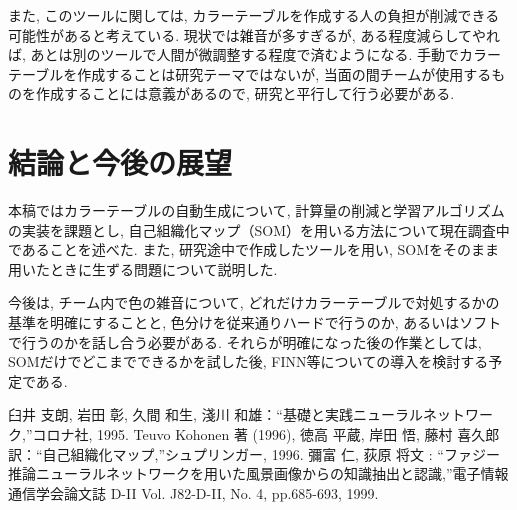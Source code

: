 \documentclass[a4paper,11pt]{jarticle}
\begin{document}
また, このツールに関しては,
カラーテーブルを作成する人の負担が削減できる可能性があると考えている. 
現状では雑音が多すぎるが, ある程度減らしてやれば,
あとは別のツールで人間が微調整する程度で済むようになる. 
手動でカラーテーブルを作成することは研究テーマではないが,
当面の間チームが使用するものを作成することには意義があるので,
研究と平行して行う必要がある. 


\section{結論と今後の展望}
本稿ではカラーテーブルの自動生成について,
計算量の削減と学習アルゴリズムの実装を課題とし,
自己組織化マップ（SOM）を用いる方法について現在調査中であることを述べた. 
また, 研究途中で作成したツールを用い,
SOMをそのまま用いたときに生ずる問題について説明した. 


今後は, チーム内で色の雑音について,
どれだけカラーテーブルで対処するかの基準を明確にすることと,
色分けを従来通りハードで行うのか,
あるいはソフトで行うのかを話し合う必要がある. 
それらが明確になった後の作業としては,
SOMだけでどこまでできるかを試した後,
FINN等についての導入を検討する予定である. 


\begin{thebibliography}{3}
 臼井 支朗, 岩田 彰, 久間 和生, 淺川 和雄：``基礎と実践ニューラルネットワーク,''コロナ社, 1995. 
 Teuvo Kohonen 著 (1996), 徳高 平蔵, 岸田 悟, 藤村 喜久郎 訳：``自己組織化マップ,''シュプリンガー, 1996. 
 彌富 仁, 荻原 将文 : ``ファジー推論ニューラルネットワークを用いた風景画像からの知識抽出と認識,''電子情報通信学会論文誌 D-I\hspace{0.1em}I Vol. J82-D-I\hspace{0.1em}I, No. 4, pp.685-693, 1999. 
\end{thebibliography}
\end{document}
